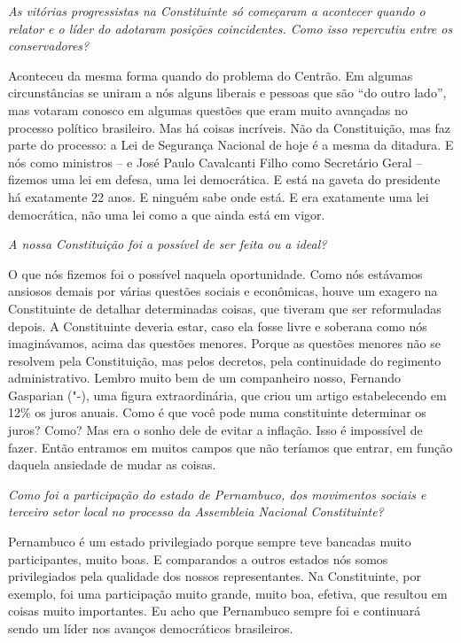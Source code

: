 \medskip

\emph{As vitórias progressistas na Constituinte só começaram a
acontecer quando o relator e o líder do  adotaram posições
coincidentes. Como isso repercutiu entre os conservadores?}

Aconteceu da mesma forma quando do problema do Centrão.
Em algumas circunstâncias se uniram a nós alguns liberais e pessoas que
são ``do outro lado'', mas votaram conosco em algumas questões que eram
muito avançadas no processo político brasileiro. Mas há coisas
incríveis. Não da Constituição, mas faz parte do processo: a Lei de
Segurança Nacional de hoje é a mesma da ditadura. E nós como ministros
-- e José Paulo Cavalcanti Filho como Secretário Geral -- fizemos uma
lei em defesa, uma lei democrática. E está na gaveta do presidente há
exatamente 22 anos. E ninguém sabe onde está. E era exatamente uma lei
democrática, não uma lei como a que ainda está em vigor.

\medskip

\emph{A nossa Constituição foi a possível de ser feita ou a ideal?}

O que nós fizemos foi o possível naquela oportunidade.
Como nós estávamos ansiosos demais por várias questões sociais e
econômicas, houve um exagero na Constituinte de detalhar determinadas
coisas, que tiveram que ser reformuladas depois. A Constituinte deveria
estar, caso ela fosse livre e soberana como nós imaginávamos, acima das
questões menores. Porque as questões menores não se resolvem pela
Constituição, mas pelos decretos, pela continuidade do regimento
administrativo. Lembro muito bem de um companheiro nosso, Fernando
Gasparian ("-), uma figura extraordinária, que criou um artigo
estabelecendo em 12\% os juros anuais. Como é que você pode numa
constituinte determinar os juros? Como? Mas era o sonho dele de evitar a
inflação. Isso é impossível de fazer. Então entramos em muitos campos
que não teríamos que entrar, em função daquela ansiedade de mudar as
coisas.

\medskip

\emph{Como foi a participação do estado de Pernambuco, dos movimentos
sociais e terceiro setor local no processo da Assembleia Nacional
Constituinte?}

Pernambuco é um estado privilegiado porque sempre teve
bancadas muito participantes, muito boas. E comparandos a outros estados
nós somos privilegiados pela qualidade dos nossos representantes. Na
Constituinte, por exemplo, foi uma participação muito grande, muito boa,
efetiva, que resultou em coisas muito importantes. Eu acho que
Pernambuco sempre foi e continuará sendo um líder nos avanços
democráticos brasileiros.

